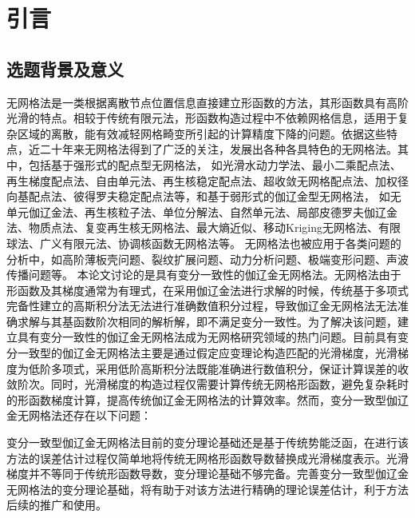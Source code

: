 \chapter{引言}
\section{选题背景及意义}
无网格法\cite{belytschkoMeshlessMethodsOverview1996b,chen2017,zhang2009,liu2009,wang2021b}是一类根据离散节点位置信息直接建立形函数的方法，其形函数具有高阶光滑的特点。相较于传统有限元法\cite{hughes2000, 2014Computer}，形函数构造过程中不依赖网格信息，适用于复杂区域的离散，能有效减轻网格畸变所引起的计算精度下降的问题。依据这些特点，近二十年来无网格法得到了广泛的关注，发展出各种各具特色的无网格法。其中，包括基于强形式的配点型无网格法，
如光滑水动力学法\cite{1977A}、最小二乘配点法\cite{zhang2001}、再生梯度配点法\cite{chi2013}、自由单元法\cite{GaoXiaoWei2019}、再生核稳定配点法\cite{wang2020c}、超收敛无网格配点法\cite{deng2023}、加权径向基配点法\cite{xue2024}、彼得罗夫稳定配点法\cite{wang2022b}等，和基于弱形式的伽辽金型无网格法，
如无单元伽辽金法\cite{belytschko1994}、再生核粒子法\cite{liu1995}、单位分解法\cite{babuska1997}、自然单元法\cite{sukumar1998}、局部皮德罗夫伽辽金法\cite{long2002}、物质点法\cite{LianYanPing2013}、复变再生核无网格法\cite{ChengYuMin2005}、最大熵近似\cite{millan2011}、移动Kriging无网格法\cite{thai2016}、有限球法\cite{de2001}、广义有限元法\cite{strouboulis2001}、协调核函数无网格法\cite{koester2019}等。
无网格法也被应用于各类问题的分析中，如高阶薄板壳问题\cite{chen2015,deng2019,hilali2022,truong2024}、裂纹扩展问题\cite{GaoXin2018,zhu2021,nguyen2024}、动力分析问题\cite{ChenJian2022}、极端变形问题\cite{ZhangXiong2017,yreux2017}、声波传播问题\cite{you2024}等。
本论文讨论的是具有变分一致性的伽辽金无网格法\cite{chen2001,WuJunChao2016}。无网格法由于形函数及其梯度通常为有理式，在采用伽辽金法进行求解的时候，传统基于多项式完备性建立的高斯积分法无法进行准确数值积分过程，导致伽辽金无网格法无法准确求解与其基函数阶次相同的解析解，即不满足变分一致性\cite{1999Numerical, babuska2008, wu2021}。为了解决该问题，建立具有变分一致性的伽辽金无网格法成为无网格研究领域的热门问题。目前具有变分一致型的伽辽金无网格法主要是通过假定应变理论构造匹配的光滑梯度，光滑梯度为低阶多项式，采用低阶高斯积分法既能准确进行数值积分，保证计算误差的收敛阶次。同时，光滑梯度的构造过程仅需要计算传统无网格形函数，避免复杂耗时的形函数梯度计算，提高传统伽辽金无网格法的计算效率\cite{nguyen2008,nagevadiya2019}。然而，变分一致型伽辽金无网格法还存在以下问题：

变分一致型伽辽金无网格法目前的变分理论基础还是基于传统势能泛函，在进行该方法的误差估计过程仅简单地将传统无网格形函数导数替换成光滑梯度表示\cite{wu2021}。光滑梯度并不等同于传统形函数导数，变分理论基础不够完备。完善变分一致型伽辽金无网格法的变分理论基础，将有助于对该方法进行精确的理论误差估计，利于方法后续的推广和使用。

